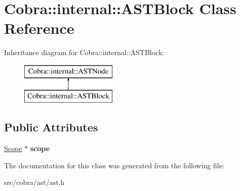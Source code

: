 \hypertarget{class_cobra_1_1internal_1_1_a_s_t_block}{\section{Cobra\+:\+:internal\+:\+:A\+S\+T\+Block Class Reference}
\label{class_cobra_1_1internal_1_1_a_s_t_block}
}
Inheritance diagram for Cobra\+:\+:internal\+:\+:A\+S\+T\+Block\+:\begin{figure}[H]
\begin{center}
\leavevmode
\includegraphics[height=2.000000cm]{class_cobra_1_1internal_1_1_a_s_t_block}
\end{center}
\end{figure}
\subsection*{Public Attributes}
\begin{DoxyCompactItemize}
\item 
\hypertarget{class_cobra_1_1internal_1_1_a_s_t_block_a738bd59c10dea2aef7d0bfed7da854a9}{\hyperlink{class_cobra_1_1internal_1_1_scope}{Scope} $\ast$ {\bfseries scope}}\label{class_cobra_1_1internal_1_1_a_s_t_block_a738bd59c10dea2aef7d0bfed7da854a9}

\end{DoxyCompactItemize}


The documentation for this class was generated from the following file\+:\begin{DoxyCompactItemize}
\item 
src/cobra/ast/ast.\+h\end{DoxyCompactItemize}
